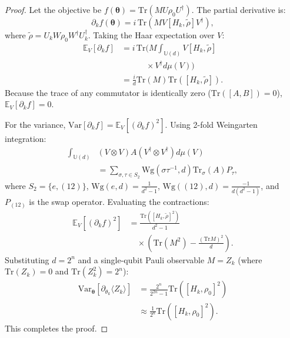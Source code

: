 \documentclass[journal]{IEEEtran}
\begin{document}
\begin{proof}
Let the objective be $f(\boldsymbol{\theta}) = \mathrm{Tr}(M U \rho_0 U^\dagger)$. The partial derivative is:
\begin{equation}
\partial_k f(\boldsymbol{\theta}) = i \, \mathrm{Tr}\left( M V [H_k, \tilde{\rho}] V^\dagger \right),
\end{equation}
where $\tilde{\rho} = U_k W \rho_0 W^\dagger U_k^\dagger$. Taking the Haar expectation over $V$:
\begin{align}
\mathbb{E}_V [\partial_k f] &= i \, \mathrm{Tr}\bigg( M \int_{\mathbb{U}(d)} V [H_k, \tilde{\rho}] \nonumber \\
&\qquad\quad \times V^\dagger d\mu(V) \bigg) \nonumber \\
&= \frac{i}{d} \mathrm{Tr}(M) \mathrm{Tr}([H_k, \tilde{\rho}]).
\label{eq:haar_expectation_zero}
\end{align}
Because the trace of any commutator is identically zero ($\mathrm{Tr}([A, B]) = 0$), $\mathbb{E}_V [\partial_k f] = 0$.

For the variance, $\mathrm{Var}[\partial_k f] = \mathbb{E}_V [(\partial_k f)^2]$. Using 2-fold Weingarten integration:
\begin{align}
\int_{\mathbb{U}(d)} &(V \otimes V) A (V^\dagger \otimes V^\dagger) d\mu(V) \nonumber \\
&= \sum_{\sigma, \tau \in S_2} \mathrm{Wg}(\sigma\tau^{-1}, d) \mathrm{Tr}_\sigma(A) P_\tau,
\label{eq:weingarten_formula}
\end{align}
where $S_2 = \{e, (12)\}$, $\mathrm{Wg}(e, d) = \frac{1}{d^2 - 1}$, $\mathrm{Wg}((12), d) = \frac{-1}{d(d^2 - 1)}$, and $P_{(12)}$ is the swap operator. Evaluating the contractions:
\begin{align}
\mathbb{E}_V [(\partial_k f)^2] &= \frac{\mathrm{Tr}\left([H_k, \tilde{\rho}]^2\right)}{d^2 - 1} \nonumber \\
&\quad \times \left( \mathrm{Tr}(M^2) - \frac{(\mathrm{Tr} M)^2}{d} \right).
\end{align}
Substituting $d = 2^n$ and a single-qubit Pauli observable $M = Z_k$ (where $\mathrm{Tr}(Z_k) = 0$ and $\mathrm{Tr}(Z_k^2) = 2^n$):
\begin{align}
\mathrm{Var}_{\boldsymbol{\theta}}[\partial_{\theta_k} \langle Z_k \rangle] &= \frac{2^n}{2^{2n} - 1} \mathrm{Tr}([H_k, \rho_0]^2) \nonumber \\
&\approx \frac{1}{2^n} \mathrm{Tr}([H_k, \rho_0]^2).
\label{eq:variance_decay_proof}
\end{align}
This completes the proof.
\end{proof}
\end{document}
